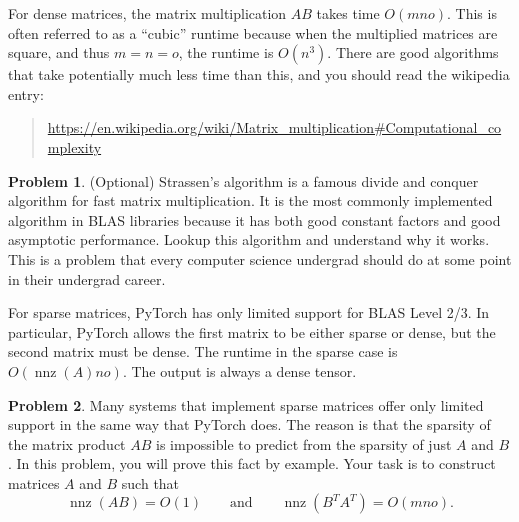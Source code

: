 \documentclass[10pt]{article}
\theoremstyle{definition}
\newtheorem{problem}{Problem}
\DeclareMathOperator{\nnz}{nnz}
\newcommand{\trans}[1]{{#1}^{T}}
\begin{document}
For dense matrices, the matrix multiplication $AB$ takes time $O(mno)$.
This is often referred to as a ``cubic'' runtime because when the multiplied matrices are square,
and thus $m=n=o$,
the runtime is $O(n^3)$.
There are good algorithms that take potentially much less time than this,
and you should read the wikipedia entry:
\begin{quote}
\url{https://en.wikipedia.org/wiki/Matrix_multiplication#Computational_complexity}
\end{quote}

\begin{problem}
    (Optional)
    Strassen's algorithm is a famous divide and conquer algorithm for fast matrix multiplication.
    It is the most commonly implemented algorithm in BLAS libraries because it has both good constant factors and good asymptotic performance.
    Lookup this algorithm and understand why it works.
    This is a problem that every computer science undergrad should do at some point in their undergrad career.
    \vspace{4in}
\end{problem}

For sparse matrices, PyTorch has only limited support for BLAS Level 2/3.
In particular, PyTorch allows the first matrix to be either sparse or dense,
but the second matrix must be dense.
The runtime in the sparse case is $O(\nnz(A)no)$.
The output is always a dense tensor.

\begin{problem}
    Many systems that implement sparse matrices offer only limited support in the same way that PyTorch does.
    The reason is that the sparsity of the matrix product $AB$ is impossible to predict from the sparsity of just $A$ and $B$.
    In this problem, you will prove this fact by example.
    Your task is to construct matrices $A$ and $B$ such that
    \begin{equation}
        \nnz(AB) = O(1)
        \qquad
        \text{and}
        \qquad
        \nnz(\trans B \trans A) = O(mno)
        .
    \end{equation}
    \vspace{3in}
\end{problem}
\end{document}
